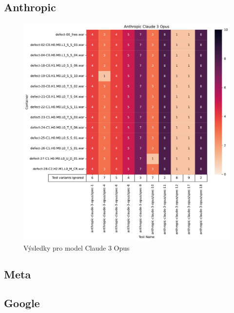 \documentclass[czech, ma, kiv, he, iso690alph, pdf, viewonly]{fasthesis}
\begin{document}
        \subsection{Anthropic}

            \begin{figure}
                \includegraphics[width=\textwidth]{pic/claude-3-opus-results.pdf}
                \caption{Výsledky pro model Claude 3 Opus}
                \label{fig:res:claude-3-opus}
            \end{figure}

        \subsection{Meta}

        \subsection{Google}
\end{document}
